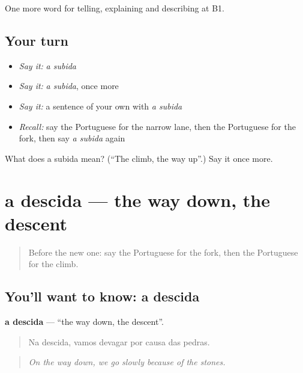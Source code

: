 \begin{grammarlens}[title={What you've built}]
One more word for telling, explaining and describing at B1.
\end{grammarlens}

\subsection*{Your turn}
\begin{itemize}
\raggedright
  \item \emph{Say it:} \emph{a subida}
  \item \emph{Say it:} \emph{a subida}, once more
  \item \emph{Say it:} a sentence of your own with \emph{a subida}
  \item \emph{Recall:} say the Portuguese for the narrow lane, then the Portuguese for the fork, then say \emph{a subida} again
\end{itemize}

\begin{tcolorbox}[breakable,colback=teal!4,colframe=teal!35!black,title={Before you move on}]
What does a subida mean? (\textquotedblleft{}The climb, the way up\textquotedblright{}.) Say it once more.
\end{tcolorbox}
\section[a descida]{a descida — the way down, the descent}

\label{lesson:PT-C438-descida}



\begin{quote}
Before the new one: say the Portuguese for the fork, then the Portuguese for the climb.
\end{quote}

\subsection*{You'll want to know: a descida}
\textbf{a descida} — \textquotedblleft{}the way down, the descent\textquotedblright{}.

\begin{quote}
Na descida, vamos devagar por causa das pedras.
\end{quote}

\begin{quote}
\emph{On the way down, we go slowly because of the stones.}
\end{quote}

